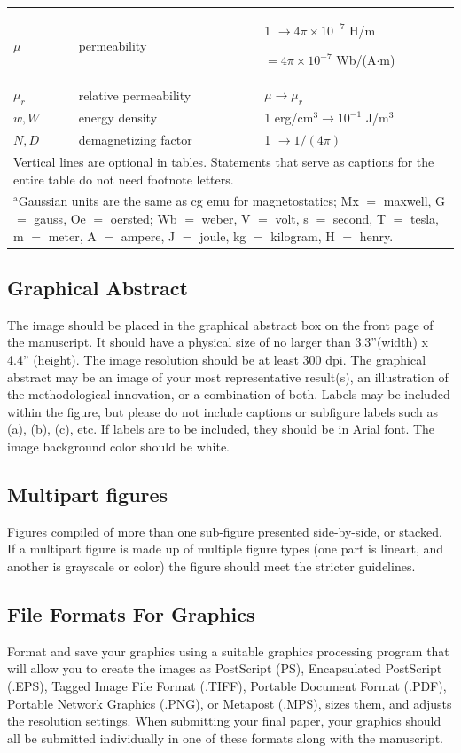 \documentclass[journal,twoside,web]{ieeecolor}
\begin{document}
\begin{table}
\begin{tabular}{p{25pt}p{75pt}p{115pt}}
$\mu $& 
permeability& 
1 $\to  4\pi \times  10^{-7}$ H/m \par $= 4\pi \times  10^{-7}$ Wb/(A$\cdot $m) \\
$\mu_{r}$& 
relative permeability& 
$\mu \to \mu_{r}$ \\
$w, W$& 
energy density& 
1 erg/cm$^{3} \to  10^{-1}$ J/m$^{3}$ \\
$N, D$& 
demagnetizing factor& 
1 $\to  1/(4\pi )$ \\
\hline\hline
\multicolumn{3}{p{251pt}}{Vertical lines are optional in tables. Statements that serve as captions for 
the entire table do not need footnote letters. }\\
\multicolumn{3}{p{251pt}}{$^{\mathrm{a}}$Gaussian units are the same as cg emu for magnetostatics; Mx 
$=$ maxwell, G $=$ gauss, Oe $=$ oersted; Wb $=$ weber, V $=$ volt, s $=$ 
second, T $=$ tesla, m $=$ meter, A $=$ ampere, J $=$ joule, kg $=$ 
kilogram, H $=$ henry.}
\end{tabular}
\label{tab1}
\end{table}

\subsection{Graphical Abstract}

The image should be placed in the graphical abstract box on the front
page of the manuscript. It should have a physical size of no larger
than 3.3''(width) x 4.4'' (height). The image resolution should be at
least 300 dpi. The graphical abstract may be an image of your most
representative result(s), an illustration of the methodological
innovation, or a combination of both. Labels may be included within
the figure, but please do not include captions or subfigure labels
such as (a), (b), (c), etc. If labels are to be included, they should
be in Arial font. The image background color should be white.

\subsection{Multipart figures}
Figures compiled of more than one sub-figure presented side-by-side, or 
stacked. If a multipart figure is made up of multiple figure
types (one part is lineart, and another is grayscale or color) the figure 
should meet the stricter guidelines.

\subsection{File Formats For Graphics}\label{formats}
Format and save your graphics using a suitable graphics processing program 
that will allow you to create the images as PostScript (PS), Encapsulated 
PostScript (.EPS), Tagged Image File Format (.TIFF), Portable Document 
Format (.PDF), Portable Network Graphics (.PNG), or Metapost (.MPS), sizes them, and adjusts 
the resolution settings. When 
submitting your final paper, your graphics should all be submitted 
individually in one of these formats along with the manuscript.
\end{document}
